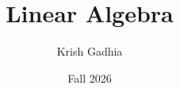 




\title{Linear Algebra}
\author{Krish Gadhia}
\date{Fall 2026}

\frontmatter
\maketitle

\setcounter{tocdepth}{1}
\tableofcontents

\mainmatter










\backmatter



